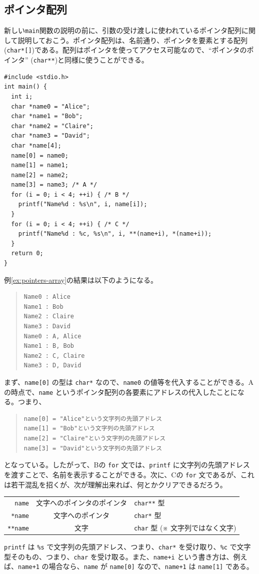 \subsection{ポインタ配列}
新しい\verb|main|関数の説明の前に、引数の受け渡しに使われているポインタ配列に関して説明しておこう。ポインタ配列は、名前通り、ポインタを要素とする配列(\verb|char*[]|)である。配列はポインタを使ってアクセス可能なので、``ポインタのポインタ'' (\verb|char**|)と同様に使うことができる。
\begin{reidai}\label{ex:pointers-array}
\begin{verbatim}
#include <stdio.h>
int main() {
  int i;
  char *name0 = "Alice";
  char *name1 = "Bob";
  char *name2 = "Claire";
  char *name3 = "David";
  char *name[4];
  name[0] = name0;
  name[1] = name1;
  name[2] = name2;
  name[3] = name3; /* A */
  for (i = 0; i < 4; ++i) { /* B */
    printf("Name%d : %s\n", i, name[i]);
  }
  for (i = 0; i < 4; ++i) { /* C */
    printf("Name%d : %c, %s\n", i, **(name+i), *(name+i));
  }
  return 0;
}
\end{verbatim}
\end{reidai} \noindent
%
例\ref{ex:pointers-array}の結果は以下のようになる。
%
\begin{quote}
\begin{verbatim}
Name0 : Alice
Name1 : Bob
Name2 : Claire
Name3 : David
Name0 : A, Alice
Name1 : B, Bob
Name2 : C, Claire
Name3 : D, David
\end{verbatim}
\end{quote}
%
まず、\verb|name[0]| の型は \verb|char*| なので、\verb|name0| の値等を代入することができる。Aの時点で、\verb|name| というポインタ配列の各要素にアドレスの代入したことになる。つまり、
%
\begin{quote}
\begin{verbatim}
name[0] = "Alice"という文字列の先頭アドレス
name[1] = "Bob"という文字列の先頭アドレス
name[2] = "Claire"という文字列の先頭アドレス
name[3] = "David"という文字列の先頭アドレス
\end{verbatim}
\end{quote}
%
となっている。したがって、Bの \verb|for| 文では、\verb|printf| に文字列の先頭アドレスを渡すことで、名前を表示することができる。次に、Cの \verb|for| 文であるが、これは若干混乱を招くが、次が理解出来れば、何とかクリアできるだろう。
%
\begin{center}
\begin{tabular}{r@{ = }c@{ = }l}
\verb|name|   & 文字へのポインタのポインタ & \verb|char**| 型\\
\verb|*name|  & 文字へのポインタ           & \verb|char*| 型\\
\verb|**name| & 文字                       & \verb|char| 型 (※ 文字列ではなく文字)
\end{tabular}
\end{center}
\verb|printf| は \verb|%s| で文字列の先頭アドレス、つまり、\verb|char*| を受け取り、\verb|%c| で文字型そのもの、つまり、\verb|char| を受け取る。また、\verb|name+i| という書き方は、例えば、\verb|name+1| の場合なら、\verb|name| が \verb|name[0]| なので、\verb|name+1| は \verb|name[1]| である。


